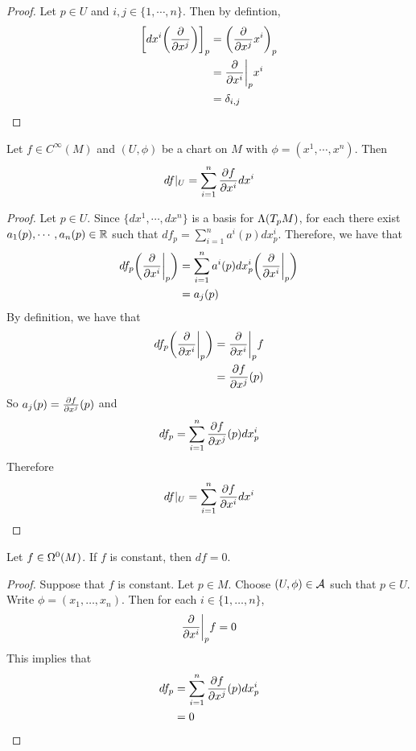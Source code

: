 \documentclass{book}
\begin{document}
	\begin{proof}
		Let $p \in U$ and $i,j \in \{1, \cdots, n\}$. Then  by defintion,
		\begin{align*}
			\bigg[ dx^i \bigg (\frac{\partial}{\partial x^j} \bigg ) \bigg]_p 
			&= \bigg(\frac{\partial}{\partial x^j} x^i \bigg )_p \\
			&= \frac{\partial}{\partial x^i} \bigg|_p x^i \\
			&= \delta_{i,j} \\
		\end{align*}
	\end{proof}

	\begin{ex}
		Let $f \in C^{\infty}(M)$ and $(U, \phi)$ be a chart on $M$ with $\phi = (x^1, \cdots, x^n)$. Then $$df|_U = \sum_{i=1}^n \frac{\partial f}{\partial x^i} dx^i$$
	\end{ex}

	\begin{proof}
		Let $p \in U$. Since $\{dx^1, \cdots, dx^n\}$ is a basis for $\Lambda(T_pM)$, for each there exist $a_1(p), \cdots, a_n(p) \in \mathbb{R}$ such that $df_p = \sum\limits_{i=1}^n a^i(p)dx^i_p$. Therefore, we have that 
		\begin{align*}
			df_p \bigg(\frac{\partial}{\partial x^i} \bigg|_p \bigg) 
			&= \sum\limits_{i=1}^n a^i(p)dx^i_p \bigg(\frac{\partial}{\partial x^i} \bigg|_p \bigg)  \\
			&=  a_j(p)
		\end{align*}
		By definition, we have that 
		\begin{align*}
			df_p\bigg(\frac{\partial}{\partial x^i} \bigg|_p \bigg) 
			&= \frac{\partial}{\partial x^i} \bigg|_p f \\ 
			&= \frac{\partial f}{\partial x^j} (p)\\
		\end{align*}
		So $a_j(p) = \frac{\partial f}{\partial x^j} (p)$ and $$df_p = \sum\limits_{i=1}^n \frac{\partial f}{\partial x^j} (p)dx^i_p$$
		Therefore $$df|_U = \sum\limits_{i=1}^n {\frac{\partial f}{\partial x^i}}dx^i$$
	\end{proof}
	
	\begin{ex}
	Let $f \in \Omega^0(M)$. If $f$ is constant, then $df = 0$. 
	\end{ex}
	
	\begin{proof}
	Suppose that $f$ is constant. Let $p \in M$. Choose $(U, \phi) \in \mathcal{A}$ such that $p \in U$. Write $\phi = (x_1, \dots, x_n)$. Then for each $i \in \{1, \dots, n\}$, $$\frac{\partial}{\partial x^i} \bigg|_p f = 0$$ This implies that 
	\begin{align*}
	df_p 
	&= \sum\limits_{i=1}^n \frac{\partial f}{\partial x^j} (p)dx^i_p \\
	&= 0
	\end{align*}
	\end{proof}
	
\end{document}
